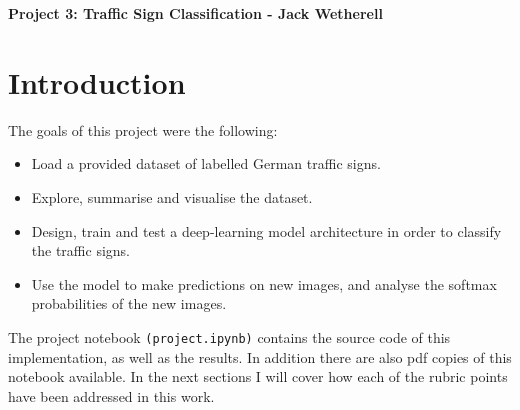 \documentclass[letterpaper,12pt]{article}
\begin{document}
\title{}
\author{}
\date{}


\begin{center}
\textbf{Project 3: Traffic Sign Classification - Jack Wetherell} \\
\end{center}


\section{Introduction}
The goals of this project were the following:
\begin{itemize}
\item Load a provided dataset of labelled German traffic signs.
\item Explore, summarise  and visualise the dataset.
\item Design, train and test a deep-learning model architecture in order to classify the traffic signs.
\item Use the model to make predictions on new images, and  analyse the softmax probabilities of the new images.
\end{itemize}
The project notebook \texttt{(project.ipynb)} contains the source code of this implementation, as well as the results. In addition there are also pdf copies of this notebook available. 
In the next sections I will cover how each of the rubric points have been addressed in this work.
\end{document}
